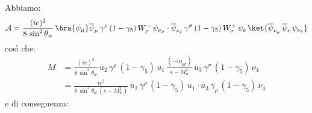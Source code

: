Abbiamo:
\begin{equation}
    \mathcal{A} = \frac{(ie)^2}{8\, \sin^2\theta_w}\, \bra{\psi_\mu}\overline{\psi}_\mu\, \gamma^\rho\, (1-\gamma_5)\, W_\rho^-\, \psi_{\nu_\mu}\cdot\overline{\psi}_{\nu_e}\, \gamma^\sigma\, (1-\gamma_5)\, W_\sigma^+\, \psi_e\, \ket{\overline{\psi}_{\nu_\mu}\, \overline{\psi}_e\, \psi_{\nu_e}}
\end{equation}
così che:
\begin{align}
    M &= \frac{(ie)^2}{8\, \sin^2\theta_w}\, \overline{u}_2\, \gamma^\rho\, (1-\gamma_5)\, u_1\, \frac{(-i\eta_{\rho\sigma})}{s-M_w^2}\, \overline{u}_3\, \gamma^\sigma\, (1-\gamma_5)\, \nu_4 \\
    &= \frac{ie^2}{8\, \sin^2\theta_w\, (s-M_w^2)}\, \overline{u}_2\, \gamma^\rho\, (1-\gamma_5)\, u_1\cdot\overline{u}_3\, \gamma_\rho\, (1-\gamma_5)\, \nu_4
\end{align}
e di conseguenza:
